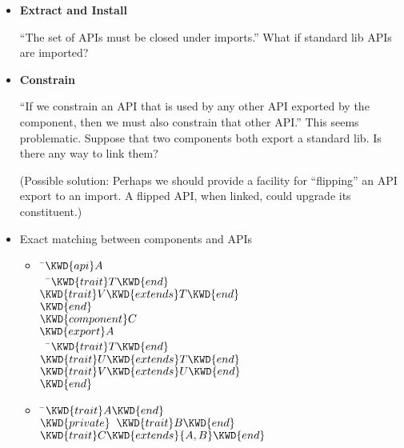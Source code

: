 \begin{itemize}
  \item {} {\bf Extract and Install}

``The set of APIs must be closed under imports.'' What if standard
  lib APIs are imported?
  \item {} {\bf Constrain}

 ``If we constrain an
  API that is used by any other API exported by the component, then we must
  also constrain that other API.'' This seems problematic. Suppose that two
  components both export a standard lib. Is there any way to link them?

(Possible solution: Perhaps we should provide a facility for ``flipping''
an API export to an import. A flipped API, when linked, could upgrade its
constituent.)

  \item Exact matching between components and APIs
    \begin{itemize}
    \item
%
\begin{Fortress}
{\tt~}\pushtabs\=\+\( \KWD{api} A\)\\
{\tt~~}\pushtabs\=\+\(   \KWD{trait} T \KWD{end}\)\\
\(   \KWD{trait} V \KWD{extends} T \KWD{end}\)\-\\\poptabs
\( \KWD{end}\)\\[4pt]
\( \KWD{component} C\)\\
\( \KWD{export} A\)\\
{\tt~~}\pushtabs\=\+\(   \KWD{trait} T \KWD{end}\)\\
\(   \KWD{trait} U \KWD{extends} T \KWD{end}\)\\
\(   \KWD{trait} V \KWD{extends} U \KWD{end}\)\-\\\poptabs
\( \KWD{end}\)\-\\\poptabs
\end{Fortress}
    \item
\begin{Fortress}
{\tt~}\pushtabs\=\+\( \KWD{trait} A \KWD{end}\)\\
\( \KWD{private}\;\;\KWD{trait} B \KWD{end}\)\\
\( \KWD{trait} C \KWD{extends} \{A,B\} \KWD{end}\)\-\\\poptabs
\end{Fortress}
    \end{itemize}


\end{itemize}
